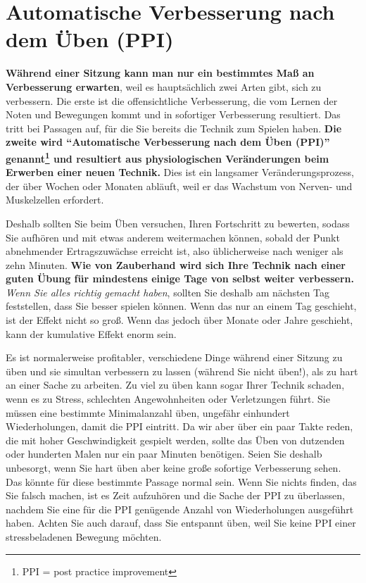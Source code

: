 
\section{Automatische Verbesserung nach dem Üben (PPI)}
\label{c1ii15}

\textbf{Während einer Sitzung kann man nur ein bestimmtes Maß an Verbesserung erwarten}, weil es hauptsächlich zwei Arten gibt, sich zu verbessern.
Die erste ist die offensichtliche Verbesserung, die vom Lernen der Noten und Bewegungen kommt und in sofortiger Verbesserung resultiert.
Das tritt bei Passagen auf, für die Sie bereits die Technik zum Spielen haben.
\textbf{Die zweite wird \enquote{Automatische Verbesserung nach dem Üben (PPI)} genannt\footnote{PPI = post practice improvement} und resultiert aus physiologischen Veränderungen beim Erwerben einer neuen Technik.}
Dies ist ein langsamer Veränderungsprozess, der über Wochen oder Monaten abläuft, weil er das Wachstum von Nerven- und Muskelzellen erfordert.

Deshalb sollten Sie beim Üben versuchen, Ihren Fortschritt zu bewerten, sodass Sie aufhören und mit etwas anderem weitermachen können, sobald der Punkt abnehmender Ertragszuwächse erreicht ist, also üblicherweise nach weniger als zehn Minuten.
\textbf{Wie von Zauberhand wird sich Ihre Technik nach einer guten Übung für mindestens einige Tage von selbst weiter verbessern.}
\textit{Wenn Sie alles richtig gemacht haben}, sollten Sie deshalb am nächsten Tag feststellen, dass Sie besser spielen können.
Wenn das nur an einem Tag geschieht, ist der Effekt nicht so groß. Wenn das jedoch über Monate oder Jahre geschieht, kann der kumulative Effekt enorm sein.

Es ist normalerweise profitabler, verschiedene Dinge während einer Sitzung zu üben und sie simultan verbessern zu lassen (während Sie nicht üben!), als zu hart an einer Sache zu arbeiten.
Zu viel zu üben kann sogar Ihrer Technik schaden, wenn es zu Stress, schlechten Angewohnheiten oder Verletzungen führt.
Sie müssen eine bestimmte Minimalanzahl üben, ungefähr einhundert Wiederholungen, damit die PPI eintritt.
Da wir aber über ein paar Takte reden, die mit hoher Geschwindigkeit gespielt werden, sollte das Üben von dutzenden oder hunderten Malen nur ein paar Minuten benötigen.
Seien Sie deshalb unbesorgt, wenn Sie hart üben aber keine große sofortige Verbesserung sehen.
Das könnte für diese bestimmte Passage normal sein.
Wenn Sie nichts finden, das Sie falsch machen, ist es Zeit aufzuhören und die Sache der PPI zu überlassen, nachdem Sie eine für die PPI genügende Anzahl von Wiederholungen ausgeführt haben.
Achten Sie auch darauf, dass Sie entspannt üben, weil Sie keine PPI einer stressbeladenen Bewegung möchten.

